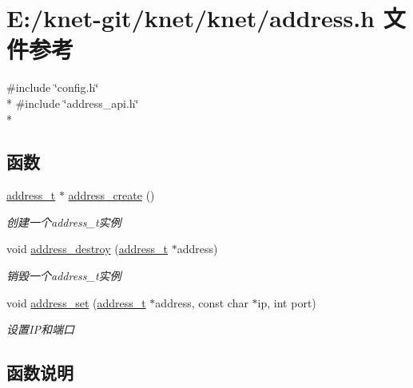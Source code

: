 \hypertarget{a00040}{}\section{E\+:/knet-\/git/knet/knet/address.h 文件参考}
\label{a00040}
{\ttfamily \#include \char`\"{}config.\+h\char`\"{}}\\*
{\ttfamily \#include \char`\"{}address\+\_\+api.\+h\char`\"{}}\\*
\subsection*{函数}
\begin{DoxyCompactItemize}
\item 
\hyperlink{a00051_a7a6e75b85c8b441f843bd40004a7d9d5_a7a6e75b85c8b441f843bd40004a7d9d5}{address\+\_\+t} $\ast$ \hyperlink{a00040_a017638ab20e8ffe8d3d088ab3352f425_a017638ab20e8ffe8d3d088ab3352f425}{address\+\_\+create} ()
\begin{DoxyCompactList}\small\item\em 创建一个address\+\_\+t实例 \end{DoxyCompactList}\item 
void \hyperlink{a00040_a0d50d3966a12ad364f3a4595d3c8af33_a0d50d3966a12ad364f3a4595d3c8af33}{address\+\_\+destroy} (\hyperlink{a00051_a7a6e75b85c8b441f843bd40004a7d9d5_a7a6e75b85c8b441f843bd40004a7d9d5}{address\+\_\+t} $\ast$address)
\begin{DoxyCompactList}\small\item\em 销毁一个address\+\_\+t实例 \end{DoxyCompactList}\item 
void \hyperlink{a00040_abbf3c9871bb3a08477b2ebba126fb2c2_abbf3c9871bb3a08477b2ebba126fb2c2}{address\+\_\+set} (\hyperlink{a00051_a7a6e75b85c8b441f843bd40004a7d9d5_a7a6e75b85c8b441f843bd40004a7d9d5}{address\+\_\+t} $\ast$address, const char $\ast$ip, int port)
\begin{DoxyCompactList}\small\item\em 设置\+I\+P和端口 \end{DoxyCompactList}\end{DoxyCompactItemize}


\subsection{函数说明}
\hypertarget{a00040_a017638ab20e8ffe8d3d088ab3352f425_a017638ab20e8ffe8d3d088ab3352f425}{}
